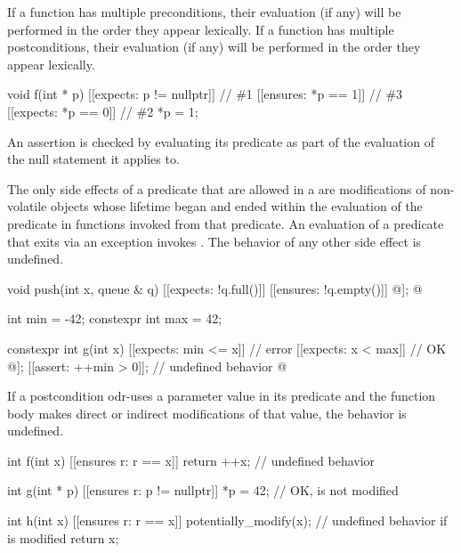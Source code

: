 \pnum
If a function has multiple preconditions,
their evaluation (if any) will be performed
in the order they appear lexically.
If a function has multiple postconditions,
their evaluation (if any) will be performed
in the order they appear lexically.
\begin{example}
\begin{codeblock}
void f(int * p)
  [[expects: p != nullptr]]                     // \#1
  [[ensures: *p == 1]]                          // \#3
  [[expects: *p == 0]]                          // \#2
{
  *p = 1;
}
\end{codeblock}
\end{example}

\pnum
An assertion is checked by evaluating its predicate
as part of the evaluation of the null statement
it applies to. 

\pnum
The only side effects of a predicate
that are allowed in a 
are modifications of non-volatile objects
whose lifetime began and ended within the evaluation of the predicate
in functions invoked from that predicate.
An evaluation of a predicate that exits via an exception
invokes .
The behavior of any other side effect is undefined.
\begin{example}
\begin{codeblock}
void push(int x, queue & q)
  [[expects: !q.full()]]
  [[ensures: !q.empty()]]
{
  @\commentellip@
  [[assert: q.is_valid()]];
  @\commentellip@
}

int min = -42;
constexpr int max = 42;

constexpr int g(int x)
  [[expects: min <= x]]                         // error
  [[expects: x < max]]                          // OK
{
  @\commentellip@
  [[assert: 2*x < max]];
  [[assert: ++min > 0]];                        // undefined behavior
  @\commentellip@
}
\end{codeblock}
\end{example}

\pnum
If a postcondition odr-uses
a parameter value in its predicate
and the function body makes direct or indirect modifications of that value,
the behavior is undefined.
\begin{example}
\begin{codeblock}
int f(int x)
  [[ensures r: r == x]] 
{
  return ++x;                   // undefined behavior
}

int g(int * p)
  [[ensures r: p != nullptr]] 
{
  *p = 42;                      // OK,  is not modified
}

int h(int x)
  [[ensures r: r == x]]
{
  potentially_modify(x);        // undefined behavior if  is modified
  return x;
}
\end{codeblock}
\end{example}

